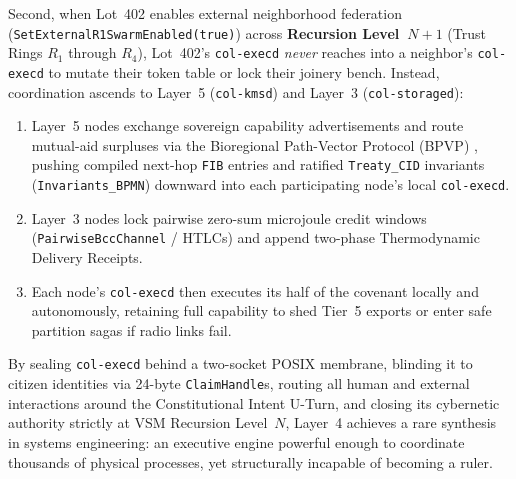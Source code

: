 Second, when Lot~402 enables external neighborhood federation
(\texttt{SetExternalR1SwarmEnabled(true)}) across \textbf{Recursion Level~$N+1$} (Trust
Rings $R_1$ through $R_4$), Lot~402's \texttt{col-execd} \textit{never} reaches into a
neighbor's \texttt{col-execd} to mutate their token table or lock their joinery bench.
Instead, coordination ascends to Layer~5 (\texttt{col-kmsd}) and Layer~3
(\texttt{col-storaged}):
\begin{enumerate}
\item Layer~5 nodes exchange sovereign capability advertisements and route mutual-aid
        surpluses via the Bioregional Path-Vector Protocol (BPVP) \parencite{rekhter2006},
        pushing compiled next-hop \texttt{FIB} entries and ratified \texttt{Treaty\_CID}
        invariants (\texttt{Invariants\_BPMN}) downward into each participating node's local
        \texttt{col-execd}.
\item Layer~3 nodes lock pairwise zero-sum microjoule credit windows
        (\texttt{PairwiseBccChannel} / HTLCs) and append two-phase Thermodynamic Delivery
        Receipts.
\item Each node's \texttt{col-execd} then executes its half of the covenant locally and
        autonomously, retaining full capability to shed Tier~5 exports or enter safe
        partition sagas if radio links fail.
\end{enumerate}

By sealing \texttt{col-execd} behind a two-socket POSIX membrane, blinding it to citizen
identities via 24-byte \texttt{ClaimHandle}s, routing all human and external interactions
around the Constitutional Intent U-Turn, and closing its cybernetic authority strictly at
VSM Recursion Level~$N$, Layer~4 achieves a rare synthesis in systems engineering: an
executive engine powerful enough to coordinate thousands of physical processes, yet
structurally incapable of becoming a ruler.
